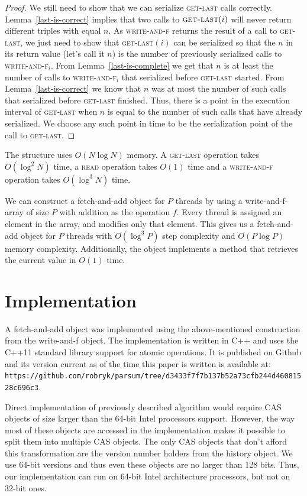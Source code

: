 \documentclass[a4paper,11pt]{article}
\newcommand{\fn}[1]{\textsc{#1}}
\begin{document}
\begin{proof}
	We still need to show that we can serialize \fn{get-last} calls correctly. Lemma~\ref{last-is-correct} implies that two calls to $\fn{get-last}(i)$ will never return different triples with equal $n$. As \fn{write-and-f} returns
	the result of a call to \fn{get-last}, we just need to show that \fn{get-last}$(i)$ can be serialized so that the $n$ in its return value (let's call it $n$) is the number of previously serialized calls to \fn{write-and-f$_i$}. From
	Lemma~\ref{last-is-complete} we get that $n$ is at least the number of calls to \fn{write-and-f$_i$} that serialized before \fn{get-last} started. From Lemma~\ref{last-is-correct} we know that $n$ was at most the number of such calls
	that serialized before \fn{get-last} finished. Thus, there is a point in the execution interval of \fn{get-last} when $n$ is equal to the number of such calls that have already serialized. We choose any such point in time to be the serialization
	point of the call to \fn{get-last}.
\end{proof}

The structure uses $O(N\log{}N)$ memory. A \fn{get-last} operation takes $O(\log^2 N)$ time, a \fn{read} operation takes $O(1)$ time and a \fn{write-and-f} operation takes $O(\log^3 N)$ time.

We can construct a fetch-and-add object for $P$ threads by using a write-and-f-array of size $P$ with addition as the operation $f$. Every thread is assigned an element in the array, and modifies only that element. This gives us
a fetch-and-add object for $P$ threads with $O(\log^3 P)$ step complexity and $O(P\log P)$ memory complexity. Additionally, the object implements a method that retrieves the
current value in $O(1)$ time.

\section{Implementation}
A fetch-and-add object was implemented using the above-mentioned construction from the write-and-f object. The implementation is written in C++ and uses the C++11 standard library support for atomic operations. It is published on Github and its version current as of the time this paper is written is available at:\\\verb+https://github.com/robryk/parsum/tree/d3433f7f7b137b52a73cfb244d46081528c696c3+.

Direct implementation of previously described algorithm would require CAS objects of size larger than the
64-bit Intel processors support. However, the way most of these objects are accessed in the implementation makes
it possible to split them into multiple CAS objects. The only CAS objects that don't afford this transformation
are the version number holders from the history object. We use 64-bit versions and thus even these objects are
no larger than 128 bits. Thus, our implementation can run on 64-bit Intel architecture processors, but not on 32-bit ones.
\end{document}
